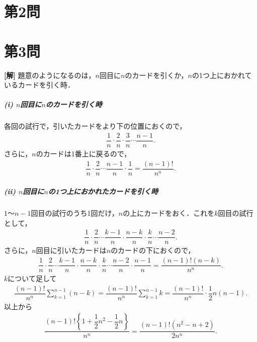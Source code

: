 \documentclass[../main.tex]{subfiles}
\begin{document}
\section*{第2問}

\newpage
\newpage

\section*{第3問}

{\bf [解]}
題意のようになるのは，$n$回目に$n$のカードを引くか，$n$の1つ上におかれているカードを引く時．

\subparagraph{(i) $n$回目に$n$のカードを引く時}
各回の試行で，引いたカードをより下の位置におくので，
\begin{align}\dfrac{1}{n}\cdot\dfrac{2}{n}\cdot\dfrac{3}{n}\cdots\dfrac{n-1}{n}.
\end{align}
さらに，$n$のカードは1番上に戻るので，
\begin{align}
  \dfrac{1}{n}\cdot\dfrac{2}{n}\cdots\dfrac{n-1}{n}\cdot\dfrac{1}{n}
  =\dfrac{(n-1)!}{n^n}.
\end{align}

\subparagraph{(ii) $n$回目に$n$の1つ上におかれたカードを引く時}
$1$〜$n-1$回目の試行のうち1回だけ，$n$の上にカードをおく．これを$k$回目の試行として，
\begin{align}
  \dfrac{1}{n}\cdot\dfrac{2}{n}\cdots\dfrac{k-1}{n}\cdot\dfrac{n-k}{n}
  \cdot\dfrac{k}{n}\cdots\dfrac{n-2}{n}.
\end{align}
さらに，$n$回目に引いたカードは$n$のカードの下におくので，
\begin{align}
  \dfrac{1}{n}\cdot\dfrac{2}{n}\cdots\dfrac{k-1}{n}\cdot\dfrac{n-k}{n}
  \cdot\dfrac{k}{n}\cdots\dfrac{n-2}{n}\cdot\dfrac{n-1}{n}
  =\dfrac{(n-1)!(n-k)}{n^n}.
\end{align}
$k$について足して
\begin{align}
  \dfrac{(n-1)!}{n^n}\sum_{k=1}^{n-1}(n-k)
  =\dfrac{(n-1)!}{n^n}\sum_{k=1}^{n-1}k
  =\dfrac{(n-1)!}{n^n}\cdot\dfrac{1}{2}n(n-1).
\end{align}
\casesend
以上から
\begin{align}
  \dfrac{(n-1)!\left\{1+\dfrac{1}{2}n^2-\dfrac{1}{2}n\right\}}{n^n}
  =\dfrac{(n-1)!(n^2-n+2)}{2n^n}.
\end{align}
\newpage
\end{document}
